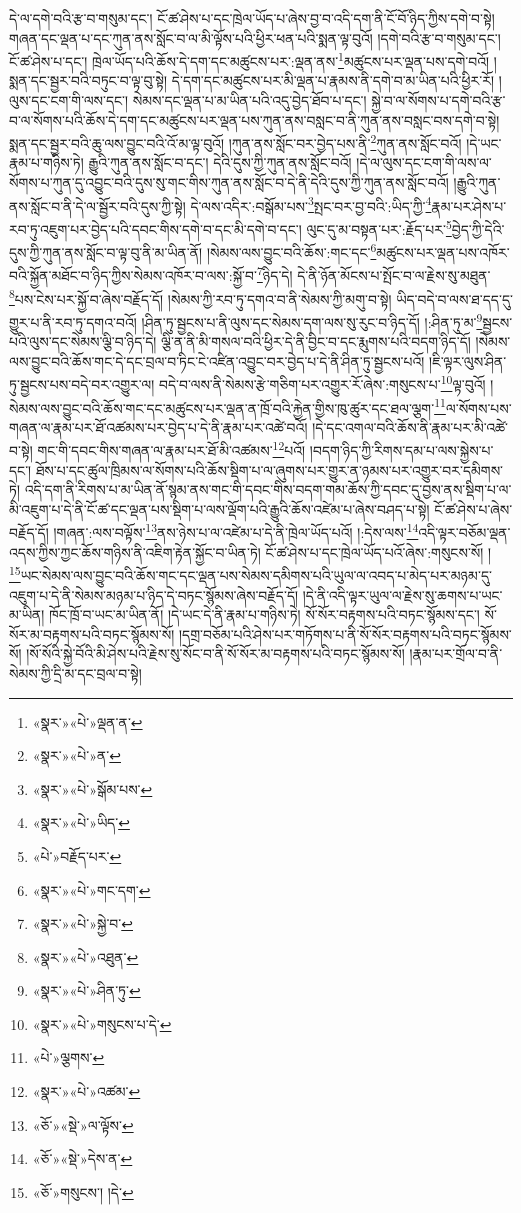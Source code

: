 དེ་ལ་དགེ་བའི་རྩ་བ་གསུམ་དང་། ངོ་ཚ་ཤེས་པ་དང་ཁྲེལ་ཡོད་པ་ཞེས་བྱ་བ་འདི་དག་ནི་ངོ་བོ་ཉིད་ཀྱིས་དགེ་བ་སྟེ། གཞན་དང་ལྡན་པ་དང་ཀུན་ནས་སློང་བ་ལ་མི་ལྟོས་པའི་ཕྱིར་ཕན་པའི་སྨན་ལྟ་བུའོ། །དགེ་བའི་རྩ་བ་གསུམ་དང་། ངོ་ཚ་ཤེས་པ་དང་། ཁྲེལ་ཡོད་པའི་ཆོས་དེ་དག་དང་མཚུངས་པར་:ལྡན་ནས་\footnote{«སྣར་»«པེ་»ལྡན་ན་}མཚུངས་པར་ལྡན་པས་དགེ་བའོ། །སྨན་དང་སྦྱར་བའི་བཏུང་བ་ལྟ་བུ་སྟེ། དེ་དག་དང་མཚུངས་པར་མི་ལྡན་པ་རྣམས་ནི་དགེ་བ་མ་ཡིན་པའི་ཕྱིར་རོ། །ལུས་དང་ངག་གི་ལས་དང་། སེམས་དང་ལྡན་པ་མ་ཡིན་པའི་འདུ་བྱེད་ཐོབ་པ་དང་། སྐྱེ་བ་ལ་སོགས་པ་དགེ་བའི་རྩ་བ་ལ་སོགས་པའི་ཆོས་དེ་དག་དང་མཚུངས་པར་ལྡན་པས་ཀུན་ནས་བསླང་བ་ནི་ཀུན་ནས་བསླང་བས་དགེ་བ་སྟེ། སྨན་དང་སྦྱར་བའི་ཆུ་ལས་བྱུང་བའི་འོ་མ་ལྟ་བུའོ། །ཀུན་ནས་སློང་བར་བྱེད་པས་ནི་\footnote{«སྣར་»«པེ་»ན་}ཀུན་ནས་སློང་བའོ། །དེ་ཡང་རྣམ་པ་གཉིས་ཏེ། རྒྱུའི་ཀུན་ནས་སློང་བ་དང་། དེའི་དུས་ཀྱི་ཀུན་ནས་སློང་བའོ། །དེ་ལ་ལུས་དང་ངག་གི་ལས་ལ་སོགས་པ་ཀུན་དུ་འབྱུང་བའི་དུས་སུ་གང་གིས་ཀུན་ནས་སློང་བ་དེ་ནི་དེའི་དུས་ཀྱི་ཀུན་ནས་སློང་བའོ། །རྒྱུའི་ཀུན་ནས་སློང་བ་ནི་དེ་ལ་སྦྱོར་བའི་དུས་ཀྱི་སྟེ། དེ་ལས་འདིར་:བསྒོམ་པས་\footnote{«སྣར་»«པེ་»སྒོམ་པས་}སྤང་བར་བྱ་བའི་:ཡིད་ཀྱི་\footnote{«སྣར་»«པེ་»ཡིད་}རྣམ་པར་ཤེས་པ་རབ་ཏུ་འཇུག་པར་བྱེད་པའི་དབང་གིས་དགེ་བ་དང་མི་དགེ་བ་དང་། ལུང་དུ་མ་བསྟན་པར་:རྗོད་པར་\footnote{«པེ་»བརྗོད་པར་}བྱེད་ཀྱི་དེའི་དུས་ཀྱི་ཀུན་ནས་སློང་བ་ལྟ་བུ་ནི་མ་ཡིན་ནོ། །སེམས་ལས་བྱུང་བའི་ཆོས་:གང་དང་\footnote{«སྣར་»«པེ་»གང་དག་}མཚུངས་པར་ལྡན་པས་འཁོར་བའི་སྐྱོན་མཐོང་བ་ཉིད་ཀྱིས་སེམས་འཁོར་བ་ལས་:སྐྱོ་བ་\footnote{«སྣར་»«པེ་»སྐྱེ་བ་}ཉིད་དེ། དེ་ནི་ཉོན་མོངས་པ་སྤོང་བ་ལ་རྗེས་སུ་མཐུན་\footnote{«སྣར་»«པེ་»འཐུན་}པས་ངེས་པར་སྐྱོ་བ་ཞེས་བརྗོད་དོ། །སེམས་ཀྱི་རབ་ཏུ་དགའ་བ་ནི་སེམས་ཀྱི་མགུ་བ་སྟེ། ཡིད་བདེ་བ་ལས་ཐ་དད་དུ་གྱུར་པ་ནི་རབ་ཏུ་དགའ་བའོ། །ཤིན་ཏུ་སྦྱངས་པ་ནི་ལུས་དང་སེམས་དག་ལས་སུ་རུང་བ་ཉིད་དོ། །:ཤིན་ཏུ་མ་\footnote{«སྣར་»«པེ་»ཤིན་ཏུ་}སྦྱངས་པའི་ལུས་དང་སེམས་ལྕི་བ་ཉིད་དེ། ལྕི་ན་ནི་མི་གསལ་བའི་ཕྱིར་དེ་ནི་བྱིང་བ་དང་རྨུགས་པའི་བདག་ཉིད་དོ། །སེམས་ལས་བྱུང་བའི་ཆོས་གང་དེ་དང་བྲལ་བ་ཏིང་ངེ་འཛིན་འབྱུང་བར་བྱེད་པ་དེ་ནི་ཤིན་ཏུ་སྦྱངས་པའོ། །ཇི་ལྟར་ལུས་ཤིན་ཏུ་སྦྱངས་པས་བདེ་བར་འགྱུར་ལ། བདེ་བ་ལས་ནི་སེམས་རྩེ་གཅིག་པར་འགྱུར་རོ་ཞེས་:གསུངས་པ་\footnote{«སྣར་»«པེ་»གསུངས་པ་དེ་}ལྟ་བུའོ། །སེམས་ལས་བྱུང་བའི་ཆོས་གང་དང་མཚུངས་པར་ལྡན་ན་ཁྲོ་བའི་རྐྱེན་གྱིས་ཁུ་ཚུར་དང་ཐལ་ལྕག་\footnote{«པེ་»ལྕགས་}ལ་སོགས་པས་གཞན་ལ་རྣམ་པར་ཐོ་འཚམས་པར་བྱེད་པ་དེ་ནི་རྣམ་པར་འཚེ་བའོ། །དེ་དང་འགལ་བའི་ཆོས་ནི་རྣམ་པར་མི་འཚེ་བ་སྟེ། གང་གི་དབང་གིས་གཞན་ལ་རྣམ་པར་ཐོ་མི་འཚམས་\footnote{«སྣར་»«པེ་»འཚམ་}པའོ། །བདག་ཉིད་ཀྱི་རིགས་དམ་པ་ལས་སྐྱེས་པ་དང་། ཐོས་པ་དང་ཚུལ་ཁྲིམས་ལ་སོགས་པའི་ཆོས་སྡིག་པ་ལ་ཞུགས་པར་གྱུར་ན་ཉམས་པར་འགྱུར་བར་དམིགས་ཏེ། འདི་དག་ནི་རིགས་པ་མ་ཡིན་ནོ་སྙམ་ནས་གང་གི་དབང་གིས་བདག་གམ་ཆོས་ཀྱི་དབང་དུ་བྱས་ནས་སྡིག་པ་ལ་མི་འཇུག་པ་དེ་ནི་ངོ་ཚ་དང་ལྡན་པས་སྡིག་པ་ལས་ལྡོག་པའི་རྒྱུའི་ཆོས་འཛེམ་པ་ཞེས་བཤད་པ་སྟེ། ངོ་ཚ་ཤེས་པ་ཞེས་བརྗོད་དོ། །གཞན་:ལས་བལྟོས་\footnote{«ཅོ་»«སྡེ་»ལ་ལྟོས་}ནས་ཉེས་པ་ལ་འཛེམ་པ་དེ་ནི་ཁྲེལ་ཡོད་པའོ། །:དེས་ལས་\footnote{«ཅོ་»«སྡེ་»དེས་ན་}འདི་ལྟར་བཅོམ་ལྡན་འདས་ཀྱིས་ཀྱང་ཆོས་གཉིས་ནི་འཇིག་རྟེན་སྐྱོང་བ་ཡིན་ཏེ། ངོ་ཚ་ཤེས་པ་དང་ཁྲེལ་ཡོད་པའོ་ཞེས་:གསུངས་སོ། །\footnote{«ཅོ་»གསུངས་། །དེ་}ཡང་སེམས་ལས་བྱུང་བའི་ཆོས་གང་དང་ལྡན་པས་སེམས་དམིགས་པའི་ཡུལ་ལ་འབད་པ་མེད་པར་མཉམ་དུ་འཇུག་པ་དེ་ནི་སེམས་མཉམ་པ་ཉིད་དེ་བཏང་སྙོམས་ཞེས་བརྗོད་དོ། །དེ་ནི་འདི་ལྟར་ཡུལ་ལ་རྗེས་སུ་ཆགས་པ་ཡང་མ་ཡིན། ཁོང་ཁྲོ་བ་ཡང་མ་ཡིན་ནོ། །དེ་ཡང་དེ་ནི་རྣམ་པ་གཉིས་ཏེ། སོ་སོར་བརྟགས་པའི་བཏང་སྙོམས་དང་། སོ་སོར་མ་བརྟགས་པའི་བཏང་སྙོམས་སོ། །དགྲ་བཅོམ་པའི་ཤེས་པར་གཏོགས་པ་ནི་སོ་སོར་བརྟགས་པའི་བཏང་སྙོམས་སོ། །སོ་སོའི་སྐྱེ་བོའི་མི་ཤེས་པའི་རྗེས་སུ་སོང་བ་ནི་སོ་སོར་མ་བརྟགས་པའི་བཏང་སྙོམས་སོ། །རྣམ་པར་གྲོལ་བ་ནི་སེམས་ཀྱི་དྲི་མ་དང་བྲལ་བ་སྟེ། 